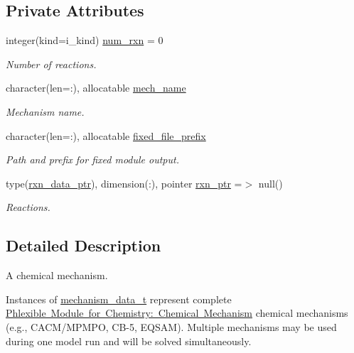 \subsection*{Private Attributes}
\begin{DoxyCompactItemize}
\item 
integer(kind=i\+\_\+kind) \mbox{\hyperlink{structpmc__mechanism__data_1_1mechanism__data__t_a755798bd522ac8a02aa80be61ebf9883}{num\+\_\+rxn}} = 0
\begin{DoxyCompactList}\small\item\em Number of reactions. \end{DoxyCompactList}\item 
character(len=\+:), allocatable \mbox{\hyperlink{structpmc__mechanism__data_1_1mechanism__data__t_aae0c666a1bf3bcf20da4804eee4b0257}{mech\+\_\+name}}
\begin{DoxyCompactList}\small\item\em Mechanism name. \end{DoxyCompactList}\item 
character(len=\+:), allocatable \mbox{\hyperlink{structpmc__mechanism__data_1_1mechanism__data__t_a3ebbe584c57e24f47ac8f6b0cb5a9da4}{fixed\+\_\+file\+\_\+prefix}}
\begin{DoxyCompactList}\small\item\em Path and prefix for fixed module output. \end{DoxyCompactList}\item 
type(\mbox{\hyperlink{structpmc__rxn__data_1_1rxn__data__ptr}{rxn\+\_\+data\+\_\+ptr}}), dimension(\+:), pointer \mbox{\hyperlink{structpmc__mechanism__data_1_1mechanism__data__t_ae58d8744533b4144cec67da07bd30183}{rxn\+\_\+ptr}} =$>$ null()
\begin{DoxyCompactList}\small\item\em Reactions. \end{DoxyCompactList}\end{DoxyCompactItemize}


\subsection{Detailed Description}
A chemical mechanism. 

Instances of \mbox{\hyperlink{structpmc__mechanism__data_1_1mechanism__data__t}{mechanism\+\_\+data\+\_\+t}} represent complete \mbox{\hyperlink{phlex_mechanism}{Phlexible Module for Chemistry\+: Chemical Mechanism}} chemical mechanisms (e.\+g., C\+A\+C\+M/\+M\+P\+M\+PO, C\+B-\/5, E\+Q\+S\+AM). Multiple mechanisms may be used during one model run and will be solved simultaneously. 

